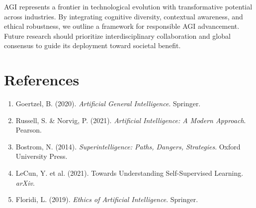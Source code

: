 \documentclass[12pt]{article}
\begin{document}
AGI represents a frontier in technological evolution with transformative potential across industries. By integrating cognitive diversity, contextual awareness, and ethical robustness, we outline a framework for responsible AGI advancement. Future research should prioritize interdisciplinary collaboration and global consensus to guide its deployment toward societal benefit.

\section*{References}

\begin{enumerate}
    \item Goertzel, B. (2020). \textit{Artificial General Intelligence}. Springer.
    \item Russell, S. \& Norvig, P. (2021). \textit{Artificial Intelligence: A Modern Approach}. Pearson.
    \item Bostrom, N. (2014). \textit{Superintelligence: Paths, Dangers, Strategies}. Oxford University Press.
    \item LeCun, Y. et al. (2021). Towards Understanding Self-Supervised Learning. \textit{arXiv}.
    \item Floridi, L. (2019). \textit{Ethics of Artificial Intelligence}. Springer.
\end{enumerate}
\end{document}
